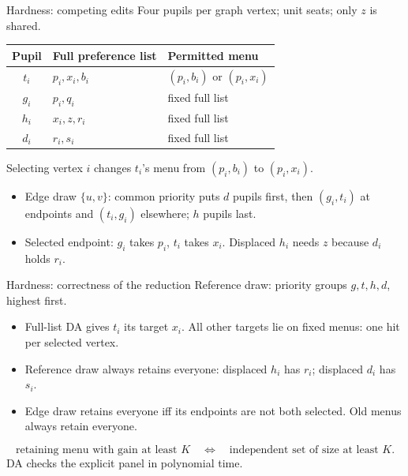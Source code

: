 \begin{frame}{Hardness: competing edits}
\small
\setlength{\parskip}{0pt}
Four pupils per graph vertex; unit seats; only $z$ is shared.
\begin{center}
\begin{tabular}{cll}
\hline
Pupil & Full preference list & Permitted menu\\
\hline
$t_i$ & $p_i,x_i,b_i$ & $(p_i,b_i)$ or $(p_i,x_i)$\\
$g_i$ & $p_i,q_i$ & fixed full list\\
$h_i$ & $x_i,z,r_i$ & fixed full list\\
$d_i$ & $r_i,s_i$ & fixed full list\\
\hline
\end{tabular}
\end{center}
Selecting vertex $i$ changes $t_i$'s menu from $(p_i,b_i)$ to $(p_i,x_i)$.
\begin{itemize}
  \item Edge draw $\{u,v\}$: common priority puts $d$ pupils first,
  then $(g_i,t_i)$ at endpoints and $(t_i,g_i)$ elsewhere; $h$ pupils last.
  \item Selected endpoint: $g_i$ takes $p_i$, $t_i$ takes $x_i$.
  Displaced $h_i$ needs $z$ because $d_i$ holds $r_i$.
\end{itemize}
\end{frame}

\begin{frame}{Hardness: correctness of the reduction}
\small
Reference draw: priority groups $g,t,h,d$, highest first.
\begin{itemize}
  \item Full-list DA gives $t_i$ its target $x_i$.
  All other targets lie on fixed menus: one hit per selected vertex.
  \item Reference draw always retains everyone: displaced $h_i$ has $r_i$;
  displaced $d_i$ has $s_i$.
  \item Edge draw retains everyone iff its endpoints are not both selected.
  Old menus always retain everyone.
\end{itemize}
\[
 \text{retaining menu with gain at least }K
 \quad\Longleftrightarrow\quad
 \text{independent set of size at least }K.
\]
DA checks the explicit panel in polynomial time.
\end{frame}

